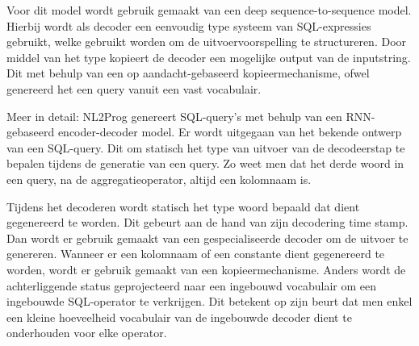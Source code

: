 Voor dit model wordt gebruik gemaakt van een deep sequence-to-sequence model. Hierbij wordt als decoder een eenvoudig type systeem van SQL-expressies gebruikt, welke gebruikt worden om de uitvoervoorspelling te structureren. Door middel van het type kopieert de decoder een mogelijke output van de inputstring. Dit met behulp van een op aandacht-gebaseerd kopieermechanisme, ofwel genereerd het een query vanuit een vast vocabulair.

Meer in detail: NL2Prog genereert SQL-query’s met behulp van een RNN-gebaseerd encoder-decoder model. Er wordt uitgegaan van het bekende ontwerp van een SQL-query. Dit om statisch het type van uitvoer van de decodeerstap te bepalen tijdens de generatie van een query. Zo weet men dat het derde woord in een query, na de aggregatieoperator, altijd een kolomnaam is. 

Tijdens het decoderen wordt statisch het type woord bepaald dat dient gegenereerd te worden. Dit gebeurt aan de hand van zijn decodering time stamp. Dan wordt er gebruik gemaakt van een gespecialiseerde decoder om de uitvoer te genereren. Wanneer er een kolomnaam of een constante dient gegenereerd te worden, wordt er gebruik gemaakt van een kopieermechanisme. Anders wordt de achterliggende status geprojecteerd naar een ingebouwd vocabulair om een ingebouwde SQL-operator te verkrijgen. Dit betekent op zijn beurt dat men enkel een kleine hoeveelheid vocabulair van de ingebouwde decoder dient te onderhouden voor elke operator.

